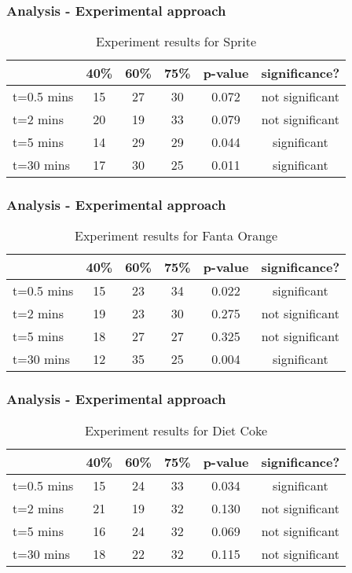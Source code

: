 \documentclass[compress,handout,10pt]{beamer}
\begin{document}
\begin{frame}
    \frametitle{Analysis - Experimental approach}

\begin{table}[ h]
\centering
\begin{tabular}{ l || c|c|c|c|c }
  &40\% &60\% & 75\% &p-value &significance? \\
\hline  
t=0.5 mins & 15 & 27 & 30&0.072&not significant\\ 
\hline  
t=2 mins & 20 & 19 & 33&0.079&not significant\\ 
\hline  
t=5 mins & 14 & 29 & 29&0.044&significant\\ 
\hline  
t=30 mins & 17 & 30 & 25&0.011&significant\\ 
\hline  
   
 \end{tabular}

\caption{Experiment results for Sprite}

\end{table}
\end{frame}

\begin{frame}
    \frametitle{Analysis - Experimental approach}

\begin{table}[ h]
\centering
\begin{tabular}{ l || c|c|c|c|c }
  &40\% &60\% & 75\% &p-value &significance? \\
\hline  
t=0.5 mins & 15 & 23 & 34&0.022&significant\\ 
\hline  
t=2 mins & 19 & 23 & 30&0.275&not significant\\ 
\hline  
t=5 mins & 18 & 27 & 27&0.325&not significant\\ 
\hline  
t=30 mins & 12 & 35 & 25&0.004&significant\\ 
\hline  
   
 \end{tabular}

\caption{Experiment results for Fanta Orange}

\end{table}
\end{frame}

\begin{frame}
    \frametitle{Analysis - Experimental approach}
\begin{table}[ h]
\centering
\begin{tabular}{ l || c|c|c|c|c }
  &40\% &60\% & 75\% &p-value &significance? \\
\hline  
t=0.5 mins & 15 & 24 & 33&0.034&significant\\ 
\hline  
t=2 mins & 21& 19 & 32&0.130 &not significant\\ 
\hline  
t=5 mins & 16 & 24 & 32&0.069&not significant\\ 
\hline  
t=30 mins & 18 & 22& 32&0.115&not significant\\ 
\hline  
   
 \end{tabular}

\caption{Experiment results for Diet Coke}

\end{table}
\end{frame}
\end{document}
